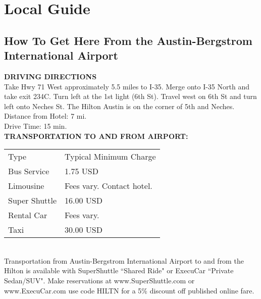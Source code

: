 {}
\chapter*{Local Guide}
\section*{How To Get Here From the Austin-Bergstrom International Airport }



\noindent \textbf{DRIVING DIRECTIONS} \\
Take Hwy 71 West approximately 5.5 miles to I-35. 
Merge onto I-35 North and take exit 234C. Turn left at the 1st light (6th St). Travel west on 6th St and turn left onto Neches St. The Hilton Austin is on the corner of 5th and Neches. \\

\noindent Distance from Hotel: 7 mi. \\
Drive Time: 15 min. \\

\noindent \textbf{TRANSPORTATION TO AND FROM AIRPORT: }

\begin{tabular}{ ll }  
Type & Typical Minimum Charge \\
Bus Service & 1.75 USD  \\
Limousine &  Fees vary. Contact hotel.  \\
Super Shuttle & 16.00 USD \\
Rental Car & Fees vary.  \\
Taxi & 30.00 USD    \\
\end{tabular} \\

\noindent Transportation from Austin-Bergstrom International Airport to and from the Hilton is available with SuperShuttle ``Shared Ride" or ExecuCar ``Private Sedan/SUV". 
Make reservations at www.SuperShuttle.com or www.ExecuCar.com use code HILTN for a 5\% discount off published online fare.


